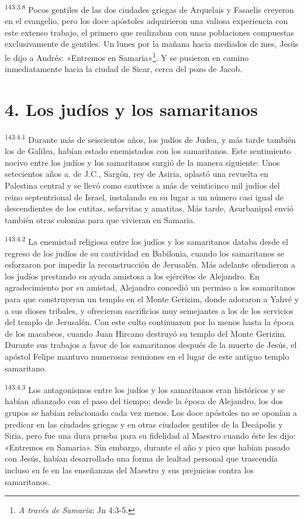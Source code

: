 \par
\textsuperscript{143:3.8} Pocos gentiles de las dos ciudades griegas de Arquelais y Fasaelis creyeron en el evangelio, pero los doce apóstoles adquirieron una valiosa experiencia con este extenso trabajo, el primero que realizaban con unas poblaciones compuestas exclusivamente de gentiles. Un lunes por la mañana hacia mediados de mes, Jesús le dijo a Andrés: «Entremos en Samaria»\footnote{\textit{A través de Samaria}: Jn 4:3-5.}. Y se pusieron en camino inmediatamente hacia la ciudad de Sicar, cerca del pozo de Jacob.

\section*{4. Los judíos y los samaritanos}
\par
\textsuperscript{143:4.1} Durante más de seiscientos años, los judíos de Judea, y más tarde también los de Galilea, habían estado enemistados con los samaritanos. Este sentimiento nocivo entre los judíos y los samaritanos surgió de la manera siguiente: Unos setecientos años a. de J.C., Sargón, rey de Asiria, aplastó una revuelta en Palestina central y se llevó como cautivos a más de veinticinco mil judíos del reino septentrional de Israel, instalando en su lugar a un número casi igual de descendientes de los cutitas, sefarvitas y amatitas. Más tarde, Asurbanipal envió también otras colonias para que vivieran en Samaria.

\par
\textsuperscript{143:4.2} La enemistad religiosa entre los judíos y los samaritanos databa desde el regreso de los judíos de su cautividad en Babilonia, cuando los samaritanos se esforzaron por impedir la reconstrucción de Jerusalén. Más adelante ofendieron a los judíos prestando su ayuda amistosa a los ejércitos de Alejandro. En agradecimiento por su amistad, Alejandro concedió un permiso a los samaritanos para que construyeran un templo en el Monte Gerizim, donde adoraron a Yahvé y a sus dioses tribales, y ofrecieron sacrificios muy semejantes a los de los servicios del templo de Jerusalén. Con este culto continuaron por lo menos hasta la época de los macabeos, cuando Juan Hircano destruyó su templo del Monte Gerizim. Durante sus trabajos a favor de los samaritanos después de la muerte de Jesús, el apóstol Felipe mantuvo numerosas reuniones en el lugar de este antiguo templo samaritano.

\par
\textsuperscript{143:4.3} Los antagonismos entre los judíos y los samaritanos eran históricos y se habían afianzado con el paso del tiempo; desde la época de Alejandro, los dos grupos se habían relacionado cada vez menos. Los doce apóstoles no se oponían a predicar en las ciudades griegas y en otras ciudades gentiles de la Decápolis y Siria, pero fue una dura prueba para su fidelidad al Maestro cuando éste les dijo: «Entremos en Samaria». Sin embargo, durante el año y pico que habían pasado con Jesús, habían desarrollado una forma de lealtad personal que trascendía incluso su fe en las enseñanzas del Maestro y sus prejuicios contra los samaritanos.

